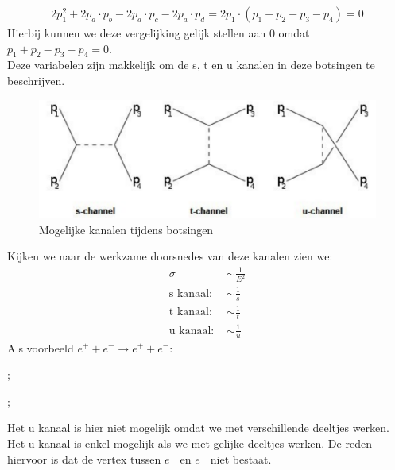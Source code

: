 \documentclass[../main.tex]{subfiles}
\begin{document}
\begin{equation}
    \begin{aligned}
        \label{eq:stu_help}
        2p_1^2+2p_a\cdot p_b-2p_a\cdot p_c-2p_a\cdot p_d = 2p_1\cdot (p_1 + p_2 - p_3 -p_4) = 0
    \end{aligned}
\end{equation}
Hierbij kunnen we deze vergelijking gelijk stellen aan $0$ omdat $p_1 + p_2 - p_3 -p_4 = 0$.\\
Deze variabelen zijn makkelijk om de s, t en u kanalen in deze botsingen te beschrijven.

\begin{figure}[h]
    \centering
    \includegraphics[width=0.8\linewidth]{introduction_and_review/kanalen.png}
    \caption{Mogelijke kanalen tijdens botsingen}%
    \label{fig:kanalen}
\end{figure}

Kijken we naar de werkzame doorsnedes van deze kanalen zien we:
\begin{equation}
    \begin{aligned}
        \label{eq:kanalen_doorsnede}
        \sigma&\sim\frac{1}{E^2}\\
        \text{s kanaal: }&\sim\frac{1}{s}\\
        \text{t kanaal: }&\sim\frac{1}{t}\\
        \text{u kanaal: }&\sim\frac{1}{u}
    \end{aligned}
\end{equation}
Als voorbeeld $e^+ +e^- \rightarrow e^+ + e^-$:\\
\begin{minipage}[c]{0.5\textwidth}
    \begin{center}
        ;
    \end{center}
\end{minipage}\noindent
\begin{minipage}[c]{0.5\textwidth}
    \begin{center}
        ;
    \end{center}
\end{minipage}
Het u kanaal is hier niet mogelijk omdat we met verschillende deeltjes werken. Het u kanaal is enkel mogelijk als we met gelijke deeltjes werken. De reden hiervoor is dat de vertex tussen $e^-$ en $e^+$ niet bestaat.
\end{document}
